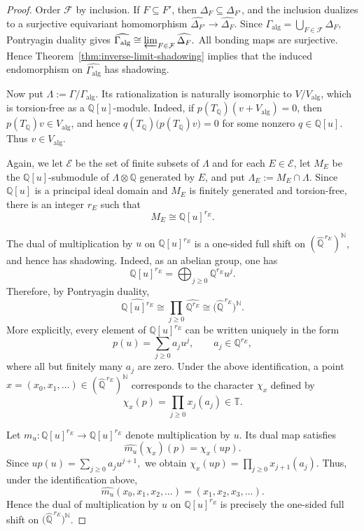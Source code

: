 \documentclass[10pt,a4paper]{amsart}
\begin{document}
\begin{proof}
Order $\mathcal F$ by inclusion. If $F\subseteq F'$, then
$\Delta_F\subseteq\Delta_{F'}$, and the inclusion dualizes to a
surjective equivariant homomorphism
$
\widehat{\Delta_{F'}}
\longrightarrow
\widehat{\Delta_F}.
$
Since
$
\Gamma_{\mathrm{alg}}
=
\bigcup_{F\in\mathcal F}\Delta_F,
$
Pontryagin duality gives
$
\widehat{\Gamma_{\mathrm{alg}}}
\cong
\varprojlim_{F\in\mathcal F}\widehat{\Delta_F}.
$
All bonding maps are surjective. Hence
Theorem~\ref{thm:inverse-limit-shadowing} implies that the induced
endomorphism on $\widehat{\Gamma_{\mathrm{alg}}}$ has shadowing.

Now put $\Lambda:=\Gamma/\Gamma_{\mathrm{alg}}$. Its rationalization
is naturally isomorphic to $V/V_{\mathrm{alg}}$, which is torsion-free
as a $\mathbb Q[u]$-module. Indeed, if
$p(T_{\mathbb Q})(v+V_{\mathrm{alg}})=0$, then
$p(T_{\mathbb Q})v\in V_{\mathrm{alg}}$, and hence
$q(T_{\mathbb Q})\big(p(T_{\mathbb Q})v\big)=0$ for some nonzero
$q\in\mathbb Q[u]$. Thus $v\in V_{\mathrm{alg}}$.

Again, we let $\mathcal E$ be the set of finite subsets of $\Lambda$ and for each $E\in \mathcal E$, let $M_E$ be the $\mathbb Q[u]$-submodule of
$\Lambda\otimes\mathbb Q$ generated by $E$, and put
$\Lambda_E:=M_E\cap\Lambda$. Since $\mathbb Q[u]$ is a principal ideal
domain and $M_E$ is finitely generated and torsion-free, there is an
integer $r_E$ such that
\[
M_E\cong\mathbb Q[u]^{r_E}.
\]

The dual of multiplication by $u$ on $\mathbb Q[u]^{r_E}$ is a
one-sided full shift on
$(\widehat{\mathbb Q}^{\,r_E})^{\mathbb N}$, and hence has shadowing.
Indeed, as an abelian group, one has
\[
\mathbb Q[u]^{r_E}
=
\bigoplus_{j\geq 0}\mathbb Q^{r_E}u^j.
\]
Therefore, by Pontryagin duality,
\[
\widehat{\mathbb Q[u]^{r_E}}
\cong
\prod_{j\geq 0}\widehat{\mathbb Q^{r_E}}
\cong
\bigl(\widehat{\mathbb Q}^{\,r_E}\bigr)^{\mathbb N}.
\]
More explicitly, every element of $\mathbb Q[u]^{r_E}$ can be written
uniquely in the form
\[
p(u)=\sum_{j\geq 0}a_j u^j,
\qquad a_j\in\mathbb Q^{r_E},
\]
where all but finitely many $a_j$ are zero. Under the above
identification, a point
$x=(x_0,x_1,\ldots)\in
(\widehat{\mathbb Q}^{\,r_E})^{\mathbb N}$
corresponds to the character $\chi_x$ defined by
\[
\chi_x(p)
=
\prod_{j\geq 0}x_j(a_j)\in \mathbb T.
\]

Let $m_u:\mathbb Q[u]^{r_E}\to\mathbb Q[u]^{r_E}$ denote
multiplication by $u$. Its dual map satisfies
\[
\widehat{m_u}(\chi_x)(p)
=
\chi_x(up).
\]
Since
$
up(u)=\sum_{j\geq 0}a_j u^{j+1},
$
we obtain
$
\chi_x(up)
=
\prod_{j\geq 0}x_{j+1}(a_j).
$
Thus, under the identification above,
\[
\widehat{m_u}(x_0,x_1,x_2,\ldots)
=
(x_1,x_2,x_3,\ldots).
\]
Hence the dual of multiplication by $u$ on
$\mathbb Q[u]^{r_E}$ is precisely the one-sided full shift on
$\bigl(\widehat{\mathbb Q}^{\,r_E}\bigr)^{\mathbb N}$.




\end{proof}
\end{document}
